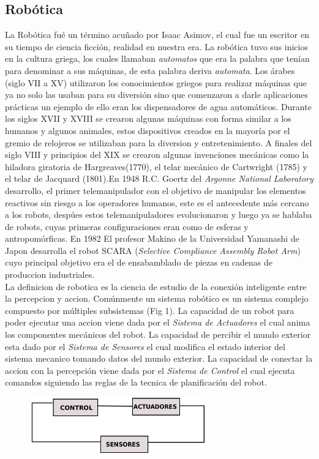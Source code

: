 \documentclass[conference]{IEEEtran}
\begin{document}
\subsection{Rob\'otica}
La Rob\'otica fu\'e un t\'ermino acu\~nado por Isaac Asimov, el cual fue un escritor en su tiempo de ciencia ficci\'on, realidad en nuestra era. La rob\'otica tuvo sus inicios en la cultura griega, los cuales llamaban \emph{automatos} que era la palabra que ten\'ian para denominar a sus m\'aquinas, de esta palabra deriva \emph{automata}. Los \'arabes (siglo VII a XV) utilizaron los conocimientos griegos para realizar m\'aquinas que ya no solo las usaban para su diversi\'on sino que comenzaron a darle aplicaciones pr\'acticas un ejemplo de ello eran los dispensadores de agua autom\'aticos. Durante los siglos XVII y XVIII  se crearon algunas m\'aquinas con forma similar a los humanos y algunos animales, estos dispositivos creados en la mayor\'ia por el gremio de relojeros se utilizaban para la diversion y entretenimiento. A finales del siglo VIII y principios del XIX se crearon algunas invenciones mec\'anicas como la hiladora giratoria de Hargreaves(1770), el telar mec\'anico de Cartwright (1785) y el telar de Jacquard (1801).En 1948 R.C. Goertz del \emph{Argonne National Laboratory} desarrollo, el primer telemanipulador con el objetivo de manipular los elementos reactivos sin riesgo a los operadores humanos, este es el antecedente m\'as cercano a los robots, desp\'ues estos telemanipuladores evolucionaron y luego ya se hablaba de robots, cuyas primeras configuraciones eran como de esferas y antropom\'orficas. En 1982 El profesor Makino de la Universidad Yamanashi de Japon desarrolla el robot SCARA (\emph{Selective Compliance Assembly Robot Arm}) cuyo principal objetivo era el de ensabamblado de piezas en cadenas de produccion industriales. \cite{lib_rob1}\\
La definicion de robotica es la ciencia de estudio de la conexi\'on inteligente entre la percepcion y accion. Com\'unmente un sistema rob\'otico es un sistema complejo compuesto por m\'ultiples subsistemas (Fig 1). La capacidad de un robot para poder ejecutar una accion viene dada por el \textit{Sistema de Actuadores} el cual anima los componentes mec\'anicos del robot. La capacidad de percibir el mundo exterior esta dado por el \textit{Sistema de Sensores} el cual modifica el estado interior del sistema mecanico tomando datos del mundo exterior. La capacidad de conectar la accion con la percepci\'on viene dada por el \textit{Sistema de Control} el cual ejecuta comandos siguiendo las reglas de la tecnica de planificaci\'on del robot.\cite{lib_rob2}
\begin{figure}
\centering
\includegraphics[width=3.0in]{imagen3.pdf}

\label{fig_mar}
\end{figure}
\end{document}
